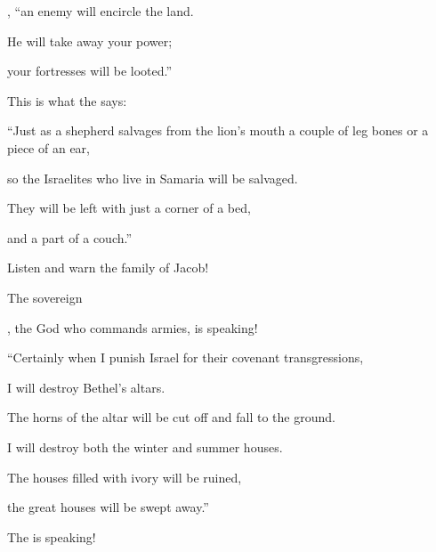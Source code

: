 {{}, “an enemy
will encircle
the land.
\par }{\Q He will take
away your power;
\par }{\Q your fortresses
will be looted.”
\par }{\Q {}This is what
the {}
says:
\par }{\Q “Just
as a shepherd
salvages
from the lion’s
mouth
a couple
of leg
bones or
a piece
of an ear,
\par }{\Q so
the Israelites
who live
in Samaria
will be salvaged.
\par }{\Q They will be left with just a corner
of a bed,
\par }{\Q and a part
of a couch.”
\par }{\Q {}Listen
and warn
the family
of Jacob!

\par }{\Q The sovereign

{}, the God
who commands armies,
is speaking!
\par }{\Q {}“Certainly
when
I punish
Israel
for their covenant transgressions,
\par }{\Q I will destroy Bethel’s
altars.
\par }{\Q The horns
of the altar
will be cut off
and fall
to the ground.
\par }{\Q {}I will destroy
both
the winter
and summer
houses.
\par }{\Q The houses
filled with ivory
will be ruined,
\par }{\Q the great
houses
will be swept away.”
\par }{\Q The
{}
is speaking!

\par }
